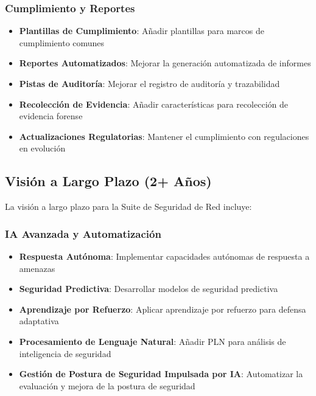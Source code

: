 \subsubsection{Cumplimiento y Reportes}
\begin{itemize}
    \item \textbf{Plantillas de Cumplimiento}: Añadir plantillas para marcos de cumplimiento comunes
    \item \textbf{Reportes Automatizados}: Mejorar la generación automatizada de informes
    \item \textbf{Pistas de Auditoría}: Mejorar el registro de auditoría y trazabilidad
    \item \textbf{Recolección de Evidencia}: Añadir características para recolección de evidencia forense
    \item \textbf{Actualizaciones Regulatorias}: Mantener el cumplimiento con regulaciones en evolución
\end{itemize}

\subsection{Visión a Largo Plazo (2+ Años)}
La visión a largo plazo para la Suite de Seguridad de Red incluye:

\subsubsection{IA Avanzada y Automatización}
\begin{itemize}
    \item \textbf{Respuesta Autónoma}: Implementar capacidades autónomas de respuesta a amenazas
    \item \textbf{Seguridad Predictiva}: Desarrollar modelos de seguridad predictiva
    \item \textbf{Aprendizaje por Refuerzo}: Aplicar aprendizaje por refuerzo para defensa adaptativa
    \item \textbf{Procesamiento de Lenguaje Natural}: Añadir PLN para análisis de inteligencia de seguridad
    \item \textbf{Gestión de Postura de Seguridad Impulsada por IA}: Automatizar la evaluación y mejora de la postura de seguridad
\end{itemize}

